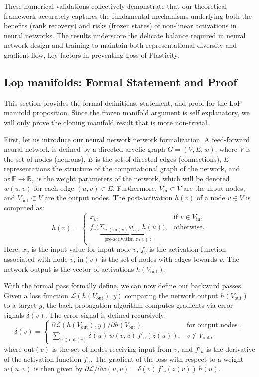 \documentclass{article}
\newcommand{\Loss}{\mathcal{L}}
\newcommand{\R}{\mathbb{R}}
\newcommand{\E}{\mathbb{E}}
\newcommand{\ff}[1]{\todo[color=blue!30,size=\tiny]{FF: #1}}
\numberwithin{figure}{section}
\begin{document}
These numerical validations collectively demonstrate that our theoretical framework accurately captures the fundamental mechanisms underlying both the benefits (rank recovery) and risks (frozen states) of non-linear activations in neural networks. The results underscore the delicate balance required in neural network design and training to maintain both representational diversity and gradient flow, key factors in preventing Loss of Plasticity.


\subsection{Lop manifolds: Formal Statement and Proof}
\label{app:cloning_manifold_details}

This section provides the formal definitions, statement, and proof for the LoP manifold proposition. Since the frozen manifold argument is self explanatory, we will only prove the cloning manifold result that is more non-trivial. 


First, let us introduce our neural network network formalization. 
A feed-forward neural network is defined by a directed acyclic graph $G=(V,E, w)$, where $V$ is the set of nodes (neurons), $E$ is the set of directed edges (connections), $E$ representations the structure of the computational graph of the network, and  $w:\E \to \R,$ is the weight parameters of the network, which will be denoted $w(u,v)$ for each edge $(u,v)\in E$. Furthermore, $V_{\text{in}} \subset V$ are the input nodes, and $V_{\text{out}} \subset V$ are the output nodes. The post-activation $h(v)$ of a node $v \in V$ is computed as:
\[
h(v)=
\begin{cases}
x_v, & \text{if } v\in V_{\text{in}},\\
f_v \Big(\underbrace{\Sigma_{u\in \text{in}(v)}w_{u,v}\,h(u)}_{\text{pre-activation }z(v):=}\Big), &\text{otherwise}.
\end{cases}
\]
Here, $x_v$ is the input value for input node $v$, $f_v$ is the activation function associated with node $v$, $\mathrm{in}(v)$ is the set of nodes with edges towards $v.$ The network output is the vector of activations $h(V_{\text{out}})$. 

With the formal pass formally define, we can now define our backward passes.  Given a loss function $\Loss(h(V_{\text{out}}),y)$ comparing the network output $h(V_{\text{out}})$ to a target $y$, the back-propagation algorithm computes gradients via error signals $\delta(v)$. The error signal is defined recursively:
\[
\delta(v)=
\begin{cases}
\partial\Loss(h(V_{\text{out}}),y)/\partial h(V_{\text{out}}), & \text{for output nodes },\\[4pt]
\displaystyle\sum_{u\in\mathrm{out}(v)}\delta(u)\,w(v,u)\,f'_u(z(u)), &v\notin V_{\text{out}},
\end{cases}
\]
where $\mathrm{out}(v)$ is the set of nodes receiving input from $v$, and $f'_u$ is the derivative of the activation function $f_u$. The gradient of the loss with respect to a weight $w(u,v)$ is then given by $\partial\Loss/\partial w(u,v)=\delta(v)\,f'_v(z(v))\,h(u)$.
\end{document}
